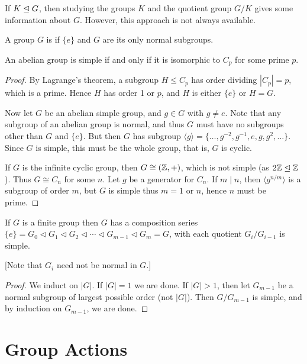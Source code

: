 \documentclass[a4paper]{scrartcl}
\begin{document}
If $K \trianglelefteq G$, then studying the groups $K$ and the quotient group $G/K$ gives some information about $G$. However, this approach is not always available.

\begin{definition}
	A group $G$ is  if $\{e\}$ and $G$ are its only normal subgroups.
\end{definition}

\begin{lemma}
	An abelian group is simple if and only if it is isomorphic to $C_p$ for some prime $p$.
\end{lemma}
\begin{proof}
	By Lagrange's theorem, a subgroup $H \leq C_p$ has order dividing $|C_p| = p$, which is a prime. Hence $H$ has order 1 or $p$, and $H$ is either $\{e\}$ or $H = G$.

	Now let $G$ be an abelian simple group, and $g \in G$ with $g \neq e$. Note that any subgroup of an abelian group is normal, and thus $G$ must have no subgroups other than $G$ and $\{e\}$. But then $G$ has subgroup $\langle g \rangle = \{\dots, g^{-2}, g^{-1}, e, g, g^2, \dots \}$. Since $G$ is simple, this must be the whole group, that is, $G$ is cyclic.

	If $G$ is the infinite cyclic group, then $G \cong (\mathbb{Z}, +)$, which is not simple (as $2 \mathbb{Z} \trianglelefteq \mathbb{Z}$). Thus $G \cong C_n$ for some $n$. Let $g$ be a generator for $C_n$. If $m \mid n$, then $\langle g^{n/m} \rangle$ is a subgroup of order $m$, but $G$ is simple thus $m = 1$ or $n$, hence $n$ must be prime.
\end{proof}

\begin{lemma}
	If $G$ is a finite group then $G$ has a composition series $\{e\} = G_0 \triangleleft G_1 \triangleleft G_2 \triangleleft \cdots \triangleleft G_{m- 1} \triangleleft G_m = G$, with each quotient $G_i / G_{i - 1}$ is simple.

	[Note that $G_i$ need not be normal in $G$.]
\end{lemma}
\begin{proof}
	We induct on $|G|$. If $|G| = 1$ we are done. If $|G| > 1$, then let $G_{m - 1}$ be a normal subgroup of largest possible order (not $|G|$). Then $G/G_{m - 1}$ is simple, and by induction on $G_{m - 1}$, we are done.
\end{proof}


\section{Group Actions}
\end{document}
